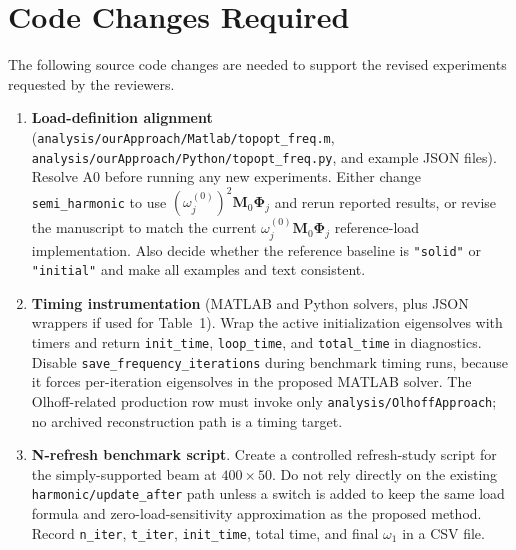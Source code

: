 \documentclass[12pt,a4paper]{article}
\begin{document}
\section{Code Changes Required}

The following source code changes are needed to support the revised
experiments requested by the reviewers.

\begin{enumerate}[leftmargin=1.6em]

  \item \textbf{Load-definition alignment}
        (\texttt{analysis/ourApproach/Matlab/topopt\_freq.m},
        \texttt{analysis/ourApproach/Python/topopt\_freq.py}, and example
        JSON files).  Resolve A0 before running any new experiments.  Either
        change \texttt{semi\_harmonic} to use
        $(\omega_j^{(0)})^2\mathbf{M}_0\boldsymbol{\Phi}_j$ and rerun
        reported results, or revise the manuscript to match the current
        $\omega_j^{(0)}\mathbf{M}_0\boldsymbol{\Phi}_j$ reference-load
        implementation.  Also decide whether the reference baseline is
        \texttt{"solid"} or \texttt{"initial"} and make all examples and text
        consistent.

  \item \textbf{Timing instrumentation}
        (MATLAB and Python solvers, plus JSON wrappers if used for Table~1).
        Wrap the active initialization eigensolves with timers and return
        \texttt{init\_time}, \texttt{loop\_time}, and \texttt{total\_time} in
        diagnostics.  Disable \texttt{save\_frequency\_iterations} during
        benchmark timing runs, because it forces per-iteration eigensolves in
        the proposed MATLAB solver.  The Olhoff-related production row must
        invoke only \texttt{analysis/OlhoffApproach}; no archived
        reconstruction path is a timing target.

  \item \textbf{N-refresh benchmark script}.
        Create a controlled refresh-study script for the simply-supported
        beam at $400{\times}50$.  Do not rely directly on the existing
        \texttt{harmonic/update\_after} path unless a switch is added to keep
        the same load formula and zero-load-sensitivity approximation as the
        proposed method.  Record \texttt{n\_iter}, \texttt{t\_iter},
        \texttt{init\_time}, total time, and final $\omega_1$ in a CSV file.


\end{enumerate}
\end{document}
